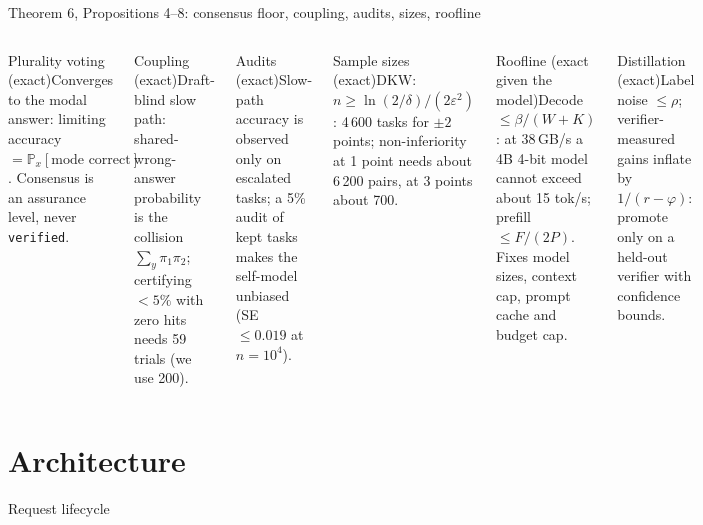\documentclass[aspectratio=169,10pt]{beamer}
\renewcommand{\Pr}{\mathbb{P}}
\begin{document}
\begin{frame}{Theorem 6, Propositions 4--8: consensus floor, coupling, audits, sizes, roofline}
\small
\begin{columns}[T]
\begin{block}{Plurality voting (exact)}Converges to the modal answer: limiting accuracy $=\Pr_x[\text{mode correct}]$. Consensus is an assurance level, never \texttt{verified}.\end{block}
\begin{block}{Coupling (exact)}Draft-blind slow path: shared-wrong-answer probability is the collision $\sum_y\pi_1\pi_2$; certifying $<5\%$ with zero hits needs 59 trials (we use 200).\end{block}
\begin{block}{Audits (exact)}Slow-path accuracy is observed only on escalated tasks; a 5\% audit of kept tasks makes the self-model unbiased (SE $\le0.019$ at $n=10^4$).\end{block}
\begin{block}{Sample sizes (exact)}DKW: $n\ge\ln(2/\delta)/(2\varepsilon^2)$: 4\,600 tasks for $\pm2$ points; non-inferiority at 1 point needs about 6\,200 pairs, at 3 points about 700.\end{block}
\begin{block}{Roofline (exact given the model)}Decode $\le\beta/(W+K)$: at 38\,GB/s a 4B 4-bit model cannot exceed about 15 tok/s; prefill $\le F/(2P)$. Fixes model sizes, context cap, prompt cache and budget cap.\end{block}
\begin{block}{Distillation (exact)}Label noise $\le\rho$; verifier-measured gains inflate by $1/(r-\varphi)$: promote only on a held-out verifier with confidence bounds.\end{block}
\end{columns}
\end{frame}

\section{Architecture}
\begin{frame}{Request lifecycle}
\centering\scalebox{1.15}{}
\end{frame}
\end{document}
